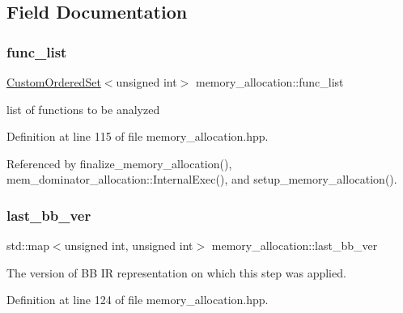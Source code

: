 \subsection{Field Documentation}
\mbox{\label{classmemory__allocation_af4a1145d8ed329af6c89a3abd67407fd}} 
\subsubsection{\texorpdfstring{func\+\_\+list}{func\_list}}
{\footnotesize\ttfamily \hyperlink{classCustomOrderedSet}{Custom\+Ordered\+Set}$<$unsigned int$>$ memory\+\_\+allocation\+::func\+\_\+list\hspace{0.3cm}{\ttfamily [protected]}}



list of functions to be analyzed 



Definition at line 115 of file memory\+\_\+allocation.\+hpp.



Referenced by finalize\+\_\+memory\+\_\+allocation(), mem\+\_\+dominator\+\_\+allocation\+::\+Internal\+Exec(), and setup\+\_\+memory\+\_\+allocation().

\mbox{\label{classmemory__allocation_a6f738971fa5c035e7fbc6194f1a715c6}} 
\subsubsection{\texorpdfstring{last\+\_\+bb\+\_\+ver}{last\_bb\_ver}}
{\footnotesize\ttfamily std\+::map$<$unsigned int, unsigned int$>$ memory\+\_\+allocation\+::last\+\_\+bb\+\_\+ver\hspace{0.3cm}{\ttfamily [protected]}}



The version of BB IR representation on which this step was applied. 



Definition at line 124 of file memory\+\_\+allocation.\+hpp.




